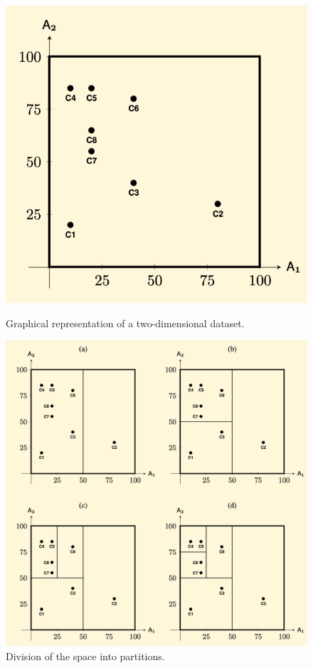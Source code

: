 \begin{figure}[h]
\centering
\begin{minipage}{0.49\textwidth}
    \centering
    \includegraphics[width=0.5\linewidth]{img/multidim_start.png}
    \caption{Graphical representation of a two-dimensional dataset.}
    \label{fig:multidim-start}
\end{minipage}
\hfill
\begin{minipage}{0.49\textwidth}
    \centering
    \includegraphics[width=\linewidth]{img/multidim_index.png}
    \caption{Division of the space into partitions.}
    \label{fig:multidim-index}
\end{minipage}
\end{figure}

